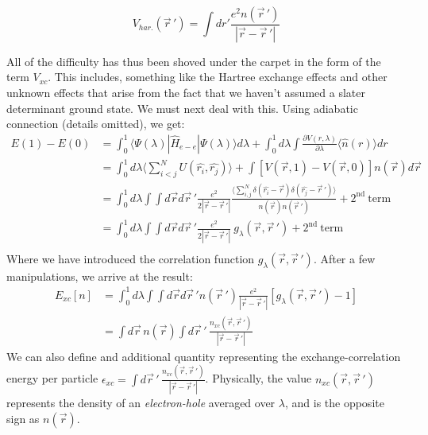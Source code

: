 \documentclass[]{article}
\begin{document}
        \begin{equation} \label{eq:vhartree}
                V_{har.}({\vec{r}\,}') = \int dr' \frac{e^2 n({\vec{r}\,}')}{|\vec{r} - {\vec{r}\,}'|}
        \end{equation}

        All of the difficulty has thus been shoved under the carpet in the form of the
        term $V_{xc}$. This includes, something like the Hartree exchange effects and other
        unknown effects that arise from the fact that we haven't assumed a slater determinant
        ground state. We must next deal with this.
        Using adiabatic connection (details omitted), we get:
        \begin{equation}\label{eq:adiabat_cont}
        \begin{aligned}
          E(1) - E(0) &= \int_{0}^{1} \langle \Psi(\lambda)| \widehat{H}_{e-e}
          |\Psi(\lambda) \rangle d\lambda + \int_{0}^{1} d\lambda \int
          \frac{\partial V(r,\lambda)}{\partial \lambda}\langle\hat{n}(r)\rangle dr\\
          &= \int^{1}_{0} d\lambda \biggl\langle \sum_{i<j}^{N}U(\hat{r_i}, \hat{r_j})
          \biggr\rangle + \int [V(\vec{r}, 1) - V(\vec{r},0)]n(\vec{r})d\vec{r}\\
          &= \int^{1}_{0} d \lambda \int \int d \vec{r} d{\vec{r}\,}'
          \frac{e^2}{2|\vec{r} - {\vec{r}\,}'|} \frac{\biggl\langle \sum_{i,j}^{N}
           \delta(\hat{r_i} - \vec{r}) \delta(\hat{r_j} - {\vec{r}\,}') \biggr\rangle}
         {n(\vec{r})n({\vec{r}\,}')} + \mathrm{2^{nd}\  term}\\
         &= \int^{1}_{0} d \lambda \int \int d \vec{r} d{\vec{r}\,}'
         \frac{e^2}{2|\vec{r} - {\vec{r}\,}'|}\ g_\lambda(\vec{r}, {\vec{r}\,}')
         + \mathrm{2^{nd}\  term}\\
        \end{aligned}
      \end{equation}
      Where we have introduced the correlation function $g_\lambda(\vec{r}, {\vec{r}\,}')$. After a few
      manipulations, we arrive at the result:
      \begin{equation}
        \begin{aligned}
        \label{eq:9}
        E_{xc}[n] &= \int^{1}_{0}d\lambda \int \int d\vec{r} d{\vec{r}\,}' n({\vec{r}\,}')
        \frac{e^2}{|\vec{r} - {\vec{r}\,}'|} [g_\lambda(\vec{r}, {\vec{r}\,}') - 1]\\
        &= \int d\vec{r}\, n(\vec{r}) \int d{\vec{r}\,}'\, \frac{n_{xc}(\vec{r}, {\vec{r}\,}')}
        {|\vec{r} - {\vec{r}\,}'|}
        \end{aligned}
      \end{equation}
      We can also define and additional quantity representing the exchange-correlation
      energy per particle $\epsilon_{xc} = \int d{\vec{r}\,}'\, \frac{n_{xc}
        (\vec{r}, {\vec{r}\,}')}{|\vec{r} - {\vec{r}\,}'|}$. Physically, the value $n_{xc}(\vec{r}, {\vec{r}\,}')$ represents
      the density of an \textit{electron-hole} averaged over $\lambda$, and is the opposite sign as $n(\vec{r})$.
      
\end{document}
